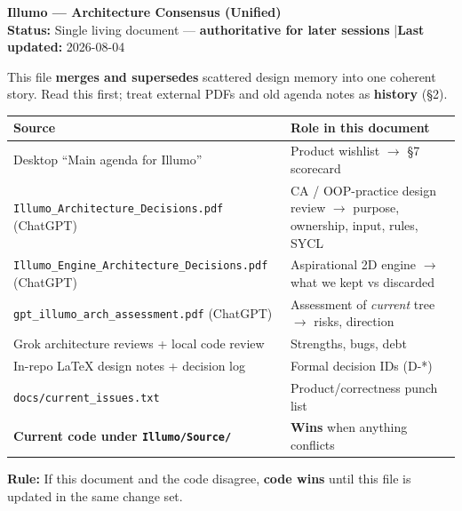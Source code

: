 \documentclass[10pt,a4paper]{article}
\begin{document}
\begin{center}
    {\LARGE \bfseries \textcolor{navyblue}{Illumo --- Architecture Consensus (Unified)}} \\[0.4em]
    {\small \textbf{Status:} Single living document --- \textbf{authoritative for later sessions} \quad|\quad \textbf{Last updated:} 2026-08-04}
\end{center}

\vspace{0.2em}
\noindent This file \textbf{merges and supersedes} scattered design memory into one coherent story. Read this first; treat external PDFs and old agenda notes as \textbf{history} (\S 2).

\vspace{0.8em}

\begin{table}[h!]
\centering
\small
\begin{tabularx}{\textwidth}{l X}
\toprule
\textbf{Source} & \textbf{Role in this document} \\
\midrule
Desktop ``Main agenda for Illumo'' & Product wishlist $\rightarrow$ \S7 scorecard \\
\texttt{Illumo\_Architecture\_Decisions.pdf} (ChatGPT) & CA / OOP-practice design review $\rightarrow$ purpose, ownership, input, rules, SYCL \\
\texttt{Illumo\_Engine\_Architecture\_Decisions.pdf} (ChatGPT) & Aspirational 2D engine $\rightarrow$ what we kept vs discarded \\
\texttt{gpt\_illumo\_arch\_assessment.pdf} (ChatGPT) & Assessment of \textit{current} tree $\rightarrow$ risks, direction \\
Grok architecture reviews + local code review & Strengths, bugs, debt \\
In-repo LaTeX design notes + decision log & Formal decision IDs (D-*) \\
\texttt{docs/current\_issues.txt} & Product/correctness punch list \\
\textbf{Current code under \texttt{Illumo/Source/}} & \textbf{Wins} when anything conflicts \\
\bottomrule
\end{tabularx}
\end{table}

\begin{tcolorbox}[colback=lightgrey,colframe=slate,boxrule=0.5pt,arc=2pt]
\textbf{Rule:} If this document and the code disagree, \textbf{code wins} until this file is updated in the same change set.
\end{tcolorbox}
\end{document}
